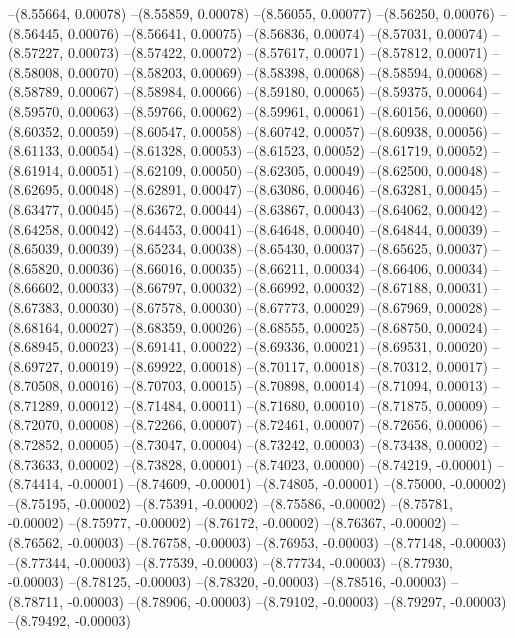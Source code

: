 --(8.55664, 0.00078)
--(8.55859, 0.00078)
--(8.56055, 0.00077)
--(8.56250, 0.00076)
--(8.56445, 0.00076)
--(8.56641, 0.00075)
--(8.56836, 0.00074)
--(8.57031, 0.00074)
--(8.57227, 0.00073)
--(8.57422, 0.00072)
--(8.57617, 0.00071)
--(8.57812, 0.00071)
--(8.58008, 0.00070)
--(8.58203, 0.00069)
--(8.58398, 0.00068)
--(8.58594, 0.00068)
--(8.58789, 0.00067)
--(8.58984, 0.00066)
--(8.59180, 0.00065)
--(8.59375, 0.00064)
--(8.59570, 0.00063)
--(8.59766, 0.00062)
--(8.59961, 0.00061)
--(8.60156, 0.00060)
--(8.60352, 0.00059)
--(8.60547, 0.00058)
--(8.60742, 0.00057)
--(8.60938, 0.00056)
--(8.61133, 0.00054)
--(8.61328, 0.00053)
--(8.61523, 0.00052)
--(8.61719, 0.00052)
--(8.61914, 0.00051)
--(8.62109, 0.00050)
--(8.62305, 0.00049)
--(8.62500, 0.00048)
--(8.62695, 0.00048)
--(8.62891, 0.00047)
--(8.63086, 0.00046)
--(8.63281, 0.00045)
--(8.63477, 0.00045)
--(8.63672, 0.00044)
--(8.63867, 0.00043)
--(8.64062, 0.00042)
--(8.64258, 0.00042)
--(8.64453, 0.00041)
--(8.64648, 0.00040)
--(8.64844, 0.00039)
--(8.65039, 0.00039)
--(8.65234, 0.00038)
--(8.65430, 0.00037)
--(8.65625, 0.00037)
--(8.65820, 0.00036)
--(8.66016, 0.00035)
--(8.66211, 0.00034)
--(8.66406, 0.00034)
--(8.66602, 0.00033)
--(8.66797, 0.00032)
--(8.66992, 0.00032)
--(8.67188, 0.00031)
--(8.67383, 0.00030)
--(8.67578, 0.00030)
--(8.67773, 0.00029)
--(8.67969, 0.00028)
--(8.68164, 0.00027)
--(8.68359, 0.00026)
--(8.68555, 0.00025)
--(8.68750, 0.00024)
--(8.68945, 0.00023)
--(8.69141, 0.00022)
--(8.69336, 0.00021)
--(8.69531, 0.00020)
--(8.69727, 0.00019)
--(8.69922, 0.00018)
--(8.70117, 0.00018)
--(8.70312, 0.00017)
--(8.70508, 0.00016)
--(8.70703, 0.00015)
--(8.70898, 0.00014)
--(8.71094, 0.00013)
--(8.71289, 0.00012)
--(8.71484, 0.00011)
--(8.71680, 0.00010)
--(8.71875, 0.00009)
--(8.72070, 0.00008)
--(8.72266, 0.00007)
--(8.72461, 0.00007)
--(8.72656, 0.00006)
--(8.72852, 0.00005)
--(8.73047, 0.00004)
--(8.73242, 0.00003)
--(8.73438, 0.00002)
--(8.73633, 0.00002)
--(8.73828, 0.00001)
--(8.74023, 0.00000)
--(8.74219, -0.00001)
--(8.74414, -0.00001)
--(8.74609, -0.00001)
--(8.74805, -0.00001)
--(8.75000, -0.00002)
--(8.75195, -0.00002)
--(8.75391, -0.00002)
--(8.75586, -0.00002)
--(8.75781, -0.00002)
--(8.75977, -0.00002)
--(8.76172, -0.00002)
--(8.76367, -0.00002)
--(8.76562, -0.00003)
--(8.76758, -0.00003)
--(8.76953, -0.00003)
--(8.77148, -0.00003)
--(8.77344, -0.00003)
--(8.77539, -0.00003)
--(8.77734, -0.00003)
--(8.77930, -0.00003)
--(8.78125, -0.00003)
--(8.78320, -0.00003)
--(8.78516, -0.00003)
--(8.78711, -0.00003)
--(8.78906, -0.00003)
--(8.79102, -0.00003)
--(8.79297, -0.00003)
--(8.79492, -0.00003)
